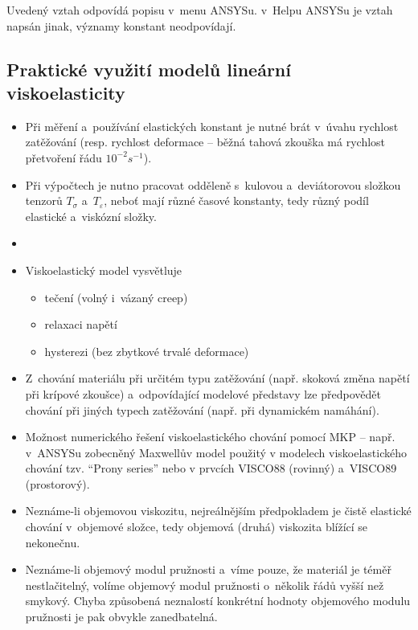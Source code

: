 Uvedený vztah odpovídá popisu v~menu ANSYSu. v~Helpu ANSYSu je vztah napsán jinak, významy konstant neodpovídají.

\subsection{Praktické využití modelů lineární viskoelasticity}
\begin{itemize}
	\item Při měření a~používání elastických konstant je nutné brát v~úvahu rychlost zatěžování (resp. rychlost deformace -- běžná tahová zkouška má rychlost přetvoření řádu $10^{-2} s^{-1}$).
	\item Při výpočtech je nutno pracovat odděleně s~kulovou a~deviátorovou složkou tenzorů $T_\sigma$ a~$T_\varepsilon$, neboť mají různé časové konstanty, tedy různý podíl elastické a~viskózní složky.
	\item {}
	\item Viskoelastický model vysvětluje
	\begin{itemize}
		\item tečení (volný i~vázaný creep)
		\item relaxaci napětí
		\item hysterezi (bez zbytkové trvalé deformace)
	\end{itemize}
	\item Z~chování materiálu při určitém typu zatěžování (např. skoková změna napětí při krípové zkoušce) a~odpovídající modelové představy lze předpovědět chování  při jiných typech zatěžování (např. při dynamickém namáhání).
	\item Možnost numerického řešení viskoelastického chování pomocí MKP -- např. v~ANSYSu zobecněný Maxwellův model použitý v modelech viskoelastického chování tzv. “Prony series” nebo v prvcích VISCO88 (rovinný) a~VISCO89 (prostorový).
	\item Neznáme-li objemovou viskozitu, nejreálnějším předpokladem je čistě elastické chování v~objemové složce, tedy objemová (druhá) viskozita blížící se nekonečnu.
	\item Neznáme-li objemový modul pružnosti a~víme pouze, že materiál je téměř nestlačitelný, volíme objemový modul pružnosti o~několik řádů vyšší než smykový. Chyba způsobená neznalostí konkrétní hodnoty objemového modulu pružnosti je pak obvykle zanedbatelná.
\end{itemize}
